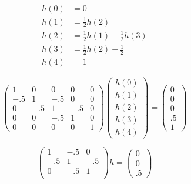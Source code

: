 \documentclass{article}
\begin{document}
\noindent
\begin{minipage}[t]{0.2\textwidth}
\begin{align*}
h(0) &= 0 \\
h(1) &= \tfrac{1}{2} h(2) \\
h(2) &= \tfrac{1}{2} h(1) + \tfrac{1}{2} h(3) \\
h(3) &= \tfrac{1}{2} h(2) + \tfrac{1}{2} \\
h(4) &= 1
\end{align*}
\end{minipage}
\hspace{1.5em}
\begin{minipage}[t]{0.40\textwidth}
$$\left(
\begin{array}{c|ccc|c}
1   & 0   & 0   & 0   & 0 \\
\hline
-.5  & 1  & -.5  & 0   & 0 \\
0   & -.5  & 1  & -.5  & 0 \\
0   & 0   & -.5  & 1  & 0 \\
\hline
0   & 0   & 0   & 0   & 1
\end{array}
\right)
\begin{pmatrix}
h(0) \\ h(1) \\ h(2) \\ h(3) \\ h(4)
\end{pmatrix}
=
\begin{pmatrix}
0 \\ 0 \\ 0 \\ .5 \\ 1
\end{pmatrix}$$
\end{minipage}
\hspace{2em}
\begin{minipage}[t]{0.24\textwidth}
\vspace*{1\baselineskip}
$$\begin{pmatrix}
1  & -.5  & 0  \\
-.5  & 1  & -.5 \\
0   & -.5  & 1 \\
\end{pmatrix}
h
=
\begin{pmatrix}
0 \\ 0 \\ .5
\end{pmatrix}$$
\end{minipage} \\ \\
\end{document}
